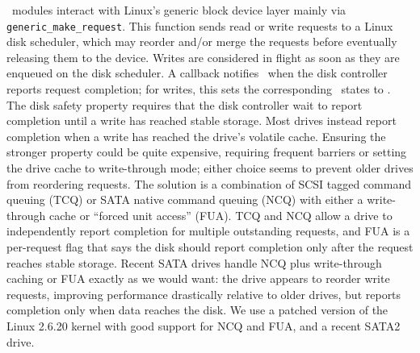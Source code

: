 \Kudos\ modules interact with Linux's generic block device layer mainly via
\verb+generic_make_request+.
%
This function sends read or write requests to a Linux disk scheduler, which
may reorder and/or merge the requests before eventually releasing them to
the device.
%
Writes are considered in flight as soon as they are enqueued on the disk
scheduler.
%
A callback notifies \Kudos\ when the disk controller reports request
completion; for writes, this sets the corresponding \patch\ states to
\PDiskst.
%
The disk safety property requires that the disk controller wait to report
completion until a write has reached stable storage.
%
Most drives instead report completion when a write has reached the drive's
volatile cache.
%
Ensuring the stronger property could be quite expensive, requiring frequent
barriers or setting the drive cache to write-through mode; either choice
seems to prevent older drives from reordering requests.
%
The solution is a combination of SCSI tagged command queuing (TCQ) or SATA
native command queuing (NCQ) with either a write-through cache or ``forced
unit access'' (FUA).
%
TCQ and NCQ allow a drive to independently report completion for multiple
outstanding requests, and FUA is a per-request flag that says the disk
should report completion only after the request reaches stable storage.
%
Recent SATA drives handle NCQ plus write-through caching or FUA exactly as
we would want: the drive appears to reorder write requests, improving
performance drastically relative to older drives, but reports completion
only when data reaches the disk.
%
We use a patched version of the Linux 2.6.20 kernel with good support for
NCQ and FUA, and a recent SATA2 drive.


